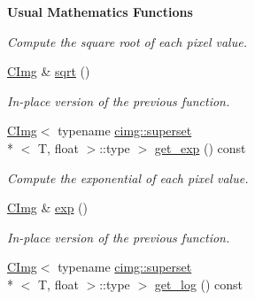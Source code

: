 \begin{Indent}{\bf Usual Mathematics Functions}
\begin{DoxyCompactItemize}
\begin{DoxyCompactList}\small\item\em Compute the square root of each pixel value. \end{DoxyCompactList}\item 
\hypertarget{structcimg__library_1_1_c_img_aacf6f18af147ad1167dd4abf01381d37}{\hyperlink{structcimg__library_1_1_c_img}{C\-Img} \& \hyperlink{structcimg__library_1_1_c_img_aacf6f18af147ad1167dd4abf01381d37}{sqrt} ()}\label{structcimg__library_1_1_c_img_aacf6f18af147ad1167dd4abf01381d37}

\begin{DoxyCompactList}\small\item\em In-\/place version of the previous function. \end{DoxyCompactList}\item 
\hypertarget{structcimg__library_1_1_c_img_aa8e6a4bf66407afed62fbdb0145b3e45}{\hyperlink{structcimg__library_1_1_c_img}{C\-Img}$<$ typename \hyperlink{structcimg__library_1_1cimg_1_1superset}{cimg\-::superset}\\*
$<$ T, float $>$\-::type $>$ \hyperlink{structcimg__library_1_1_c_img_aa8e6a4bf66407afed62fbdb0145b3e45}{get\-\_\-exp} () const }\label{structcimg__library_1_1_c_img_aa8e6a4bf66407afed62fbdb0145b3e45}

\begin{DoxyCompactList}\small\item\em Compute the exponential of each pixel value. \end{DoxyCompactList}\item 
\hypertarget{structcimg__library_1_1_c_img_a216d7a497c11ef15a3a948bad37134f3}{\hyperlink{structcimg__library_1_1_c_img}{C\-Img} \& \hyperlink{structcimg__library_1_1_c_img_a216d7a497c11ef15a3a948bad37134f3}{exp} ()}\label{structcimg__library_1_1_c_img_a216d7a497c11ef15a3a948bad37134f3}

\begin{DoxyCompactList}\small\item\em In-\/place version of the previous function. \end{DoxyCompactList}\item 
\hypertarget{structcimg__library_1_1_c_img_a360ca0efdff188057e689ef681ee46e0}{\hyperlink{structcimg__library_1_1_c_img}{C\-Img}$<$ typename \hyperlink{structcimg__library_1_1cimg_1_1superset}{cimg\-::superset}\\*
$<$ T, float $>$\-::type $>$ \hyperlink{structcimg__library_1_1_c_img_a360ca0efdff188057e689ef681ee46e0}{get\-\_\-log} () const }\label{structcimg__library_1_1_c_img_a360ca0efdff188057e689ef681ee46e0}


\end{DoxyCompactItemize}
\end{Indent}
